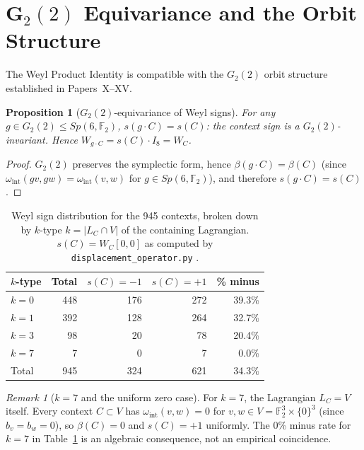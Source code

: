 \documentclass[11pt,a4paper]{article}
\newtheorem{proposition}[theorem]{Proposition}
\theoremstyle{remark}
\newtheorem{remark}[theorem]{Remark}
\begin{document}
\section{G\texorpdfstring{$_2(2)$}{2(2)} Equivariance and the Orbit Structure}\label{sec:g2}

The Weyl Product Identity is compatible with the $G_2(2)$ orbit structure
established in Papers~X--XV.

\begin{proposition}[$G_2(2)$-equivariance of Weyl signs]\label{prop:equiv}
For any $g \in G_2(2) \leq Sp(6,\mathbb{F}_2)$,
$s(g \cdot C) = s(C)$: the context sign is a $G_2(2)$-invariant.
Hence $W_{g \cdot C} = s(C) \cdot I_8 = W_C$.
\end{proposition}

\begin{proof}
$G_2(2)$ preserves the symplectic form, hence $\beta(g \cdot C) = \beta(C)$
(since $\omega_{\mathrm{int}}(gv, gw) = \omega_{\mathrm{int}}(v,w)$ for
$g \in Sp(6,\mathbb{F}_2)$), and therefore $s(g \cdot C) = s(C)$.
\end{proof}

\begin{table}[H]
\centering
\caption{Weyl sign distribution for the 945 contexts, broken down by
$k$-type $k = |L_C \cap V|$ of the containing Lagrangian.
$s(C) = W_C[0,0]$ as computed by \texttt{displacement\_operator.py}
\cite{PaperXVIsuppl}.}
\label{tab:weylsigns}
\begin{tabular}{lrrrr}
\toprule
$k$-type & Total & $s(C) = -1$ & $s(C) = +1$ & \% minus \\
\midrule
$k = 0$ & 448 & 176 & 272 & 39.3\% \\
$k = 1$ & 392 & 128 & 264 & 32.7\% \\
$k = 3$ &  98 &  20 &  78 & 20.4\% \\
$k = 7$ &   7 &   0 &   7 &  0.0\% \\
\midrule
Total   & 945 & 324 & 621 & 34.3\% \\
\bottomrule
\end{tabular}
\end{table}

\begin{remark}[$k = 7$ and the uniform zero case]
For $k = 7$, the Lagrangian $L_C = V$ itself.
Every context $C \subset V$ has $\omega_{\mathrm{int}}(v,w) = 0$ for
$v, w \in V = \mathbb{F}_2^3 \times \{0\}^3$ (since $b_v = b_w = 0$),
so $\beta(C) = 0$ and $s(C) = +1$ uniformly.
The 0\% minus rate for $k=7$ in Table~\ref{tab:weylsigns} is an algebraic
consequence, not an empirical coincidence.
\end{remark}
\end{document}
